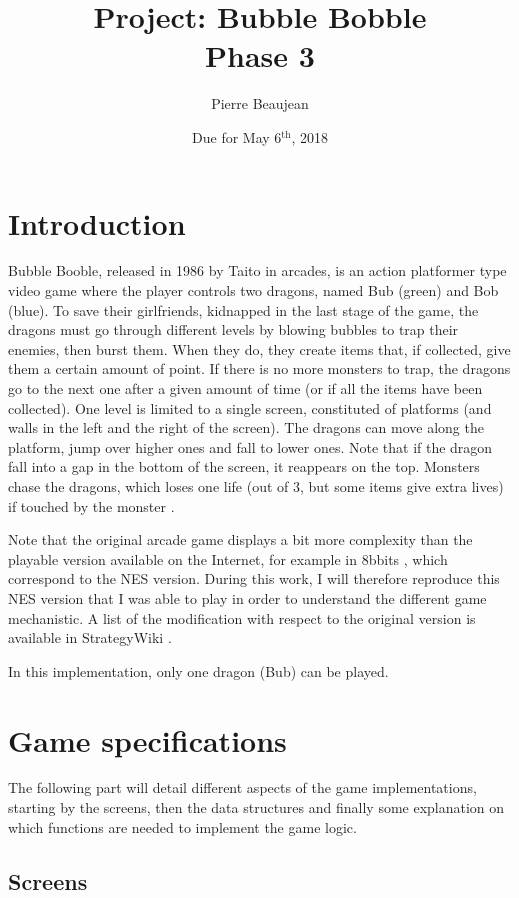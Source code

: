 \documentclass[12pt,a4paper]{article}
\title{Project: Bubble Bobble\\Phase 3}
\author{Pierre Beaujean}
\date{Due for May 6$^\text{th}$, 2018}
\begin{document}
\maketitle

\section{Introduction}

Bubble Booble, released in 1986 by Taito in arcades, is an action platformer type video game where the player controls two dragons, named Bub (green) and Bob (blue). To save their girlfriends, kidnapped in the last stage of the game, the dragons must go through different levels by blowing bubbles to trap their enemies, then burst them. When they do, they create items that, if collected, give them a certain amount of point. If there is no more monsters to trap, the dragons go to the next one after a given amount of time (or if all the items have been collected). One level is limited to a single screen, constituted of platforms (and walls in the left and the right of the screen). The dragons can move along the platform, jump over higher ones and fall to lower ones. Note that if the dragon fall into a gap in the bottom of the screen, it reappears on the top. Monsters chase the dragons, which loses one life (out of 3, but some items give extra lives) if touched by the monster \cite{wikibub,wikibub2}.

Note that the original arcade game displays a bit more complexity than the playable version available on the Internet, for example in 8bbits \cite{playbub}, which correspond to the NES version. During this work, I will therefore reproduce this NES version that I was able to play in order to understand the different game mechanistic. A list of the modification with respect to the original version is available in StrategyWiki \cite{wikibub2_nes}.

In this implementation, only one dragon (Bub) can be played.

\section{Game specifications}

The following part will detail different aspects of the game implementations, starting by the screens, then the data structures and finally some explanation on which functions are needed to implement the game logic.

\subsection{Screens}
\end{document}

